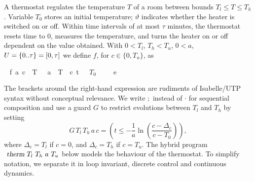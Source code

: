 \documentclass[envcountsame,envcountsect]{llncs}
\begin{document}
\begin{example}\label{ex:therm-sol}
  A thermostat regulates the temperature $T$ of a room between bounds
  $T_l\le T\le T_h$. Variable $T_0$ stores an initial temperature;
  $\vartheta$ indicates whether the heater is switched on or off.
  Within time intervals of at most $\tau$ minutes, the thermostat
  resets time to $0$, measures the temperature, and turns the heater
  on or off dependent on the value obtained.  With $0<T_l$, $T_h<T_u$,
  $0 < a$,
  $U={\emph{$\{$}}{0}{\emph{$\mathord.$}}{\emph{$\mathord.$}}{\emph{$\tau$}}{\emph{$\}$}}=[0,\tau]$
  we define $f$, for $c\in\{0,T_u\}$, as

\begin{isabellebody}
\isanewline
{}\ %
{\isachardoublequoteopen}f\ a\ c\ {\isasymequiv}\ {\isasymlbrakk}{\isacharbrackleft}T\ {\isasymmapsto}\ {\isacharminus}\ a\ {\isacharasterisk}\ {\isacharparenleft}T\ {\isacharminus}\ c{\isacharparenright}{\isacharcomma}\ t\ {\isasymmapsto}\ {}{\isacharcomma}\ $T_0$\ {\isasymmapsto}\ {}{\isacharcomma}\ {\isasymtheta}\ {\isasymmapsto}\ {}{\isacharbrackright}{\isasymrbrakk}\isactrlsub e{\isachardoublequoteclose}\isanewline
\end{isabellebody} 
\noindent The brackets around the right-hand expression are rudiments of
Isabelle/UTP syntax without conceptual relevance. We write $;$ instead
of $\cdot$ for sequential composition and use a guard $G$ to restrict
evolutions between $T_l$ and $T_h$ by setting
\begin{equation*}
G\, T_l\, T_h\, a\, c = \left(t\leq -\frac{1}{a}\ln\left(\frac{c-\Delta_c}{c-T_0}\right)\right),
\end{equation*}
where $\Delta_c = T_l$ if $c=0$, and $\Delta_c = T_h$ if $c=T_u$. The
hybrid program $\isa{therm}\ T_l\ T_h\ a\ T_u$ below models the
behaviour of the thermostat. To simplify notation, we separate it in
loop invariant, discrete control and continuous dynamics.

\begin{isabellebody}


\end{isabellebody}
\end{example}
\end{document}
